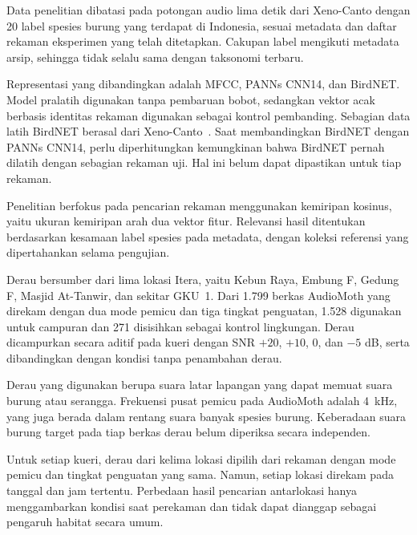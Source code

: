 \begin{daftarBernomor}
    \setlength{\emergencystretch}{2em}
    \item Data penelitian dibatasi pada potongan audio lima detik dari
    Xeno-Canto dengan 20 label spesies burung yang terdapat di
    Indonesia, sesuai metadata dan daftar rekaman eksperimen yang telah
    ditetapkan. Cakupan label mengikuti metadata arsip, sehingga tidak
    selalu sama dengan taksonomi terbaru.

    \item Representasi yang dibandingkan adalah MFCC, PANNs CNN14, dan
    BirdNET. Model pralatih digunakan tanpa pembaruan bobot, sedangkan
    vektor acak berbasis identitas rekaman digunakan sebagai kontrol
    pembanding. Sebagian data latih BirdNET berasal dari Xeno-Canto~\cite{kahl2021birdnet}. Saat membandingkan BirdNET dengan PANNs CNN14, perlu diperhitungkan kemungkinan bahwa BirdNET pernah dilatih dengan sebagian rekaman uji. Hal ini belum dapat dipastikan untuk tiap rekaman.

    \item Penelitian berfokus pada pencarian rekaman menggunakan
    kemiripan kosinus, yaitu ukuran kemiripan arah dua vektor fitur.
    Relevansi hasil ditentukan berdasarkan kesamaan label spesies pada
    metadata, dengan koleksi referensi yang dipertahankan selama
    pengujian.

    \item Derau bersumber dari lima lokasi Itera, yaitu Kebun Raya,
    Embung F, Gedung F, Masjid At-Tanwir, dan sekitar GKU~1. Dari 1.799 berkas AudioMoth yang direkam dengan dua mode pemicu dan tiga tingkat penguatan, 1.528 digunakan untuk campuran dan 271 disisihkan sebagai kontrol lingkungan. Derau
    dicampurkan secara aditif pada kueri dengan SNR $+20$, $+10$, $0$,
    dan $-5$ dB, serta dibandingkan dengan kondisi tanpa penambahan
    derau.

    \item Derau yang digunakan berupa suara latar lapangan yang dapat
    memuat suara burung atau serangga. Frekuensi pusat pemicu pada
    AudioMoth adalah 4~kHz, yang juga berada dalam rentang suara banyak
    spesies burung. Keberadaan suara burung target pada tiap berkas
    derau belum diperiksa secara independen.

    \item Untuk setiap kueri, derau dari kelima lokasi dipilih dari
    rekaman dengan mode pemicu dan tingkat penguatan yang sama. Namun,
    setiap lokasi direkam pada tanggal dan jam tertentu. Perbedaan
    hasil pencarian antarlokasi hanya menggambarkan kondisi saat
    perekaman dan tidak dapat dianggap sebagai pengaruh habitat
    secara umum.


\end{daftarBernomor}
